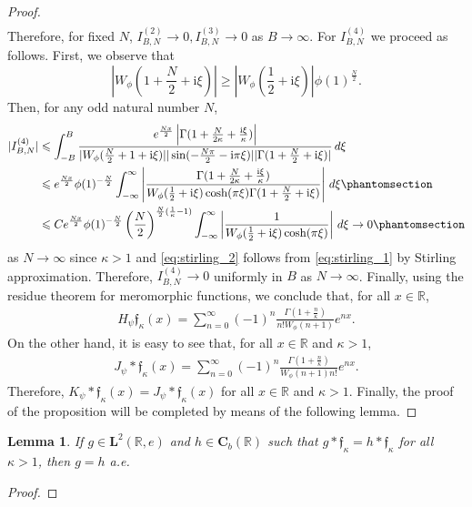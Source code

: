 \documentclass[12pt]{amsart}
\newcommand{\hlabel}{\phantomsection\label}
\numberwithin{equation}{section}
\newcommand{\bb}{\mathbb}
\renewcommand{\ge}{\geqslant}
\renewcommand{\le}{\leqslant}
\newcommand{\mf}{\mathfrak}
\newcommand{\bmrm}[2][2]{\mathbf{#2}^{#1}}
\newcommand{\Jpo}{J_{\psi}}
\newcommand{\Hpsi}{H_\psi}
\newcommand{\C}{\mathbf{C}}
\renewcommand{\i}{\mathrm{i}}
\newtheorem{lem}[thm]{Lemma}
\theoremstyle{definition}
\theoremstyle{assump}
\theoremstyle{remark}
\begin{document}
{\begin{proof}
\begin{align*}
\end{align*}
Therefore, for fixed $N$, $I^{(2)}_{B,N}\to 0, I^{(3)}_{B,N}\to 0$ as $B\to\infty$. For $I^{(4)}_{B,N}$ we proceed as follows. First, we observe that
$$\left|W_{\phi}\left(1+\frac{N}{2}+\mathrm{i}\xi\right)\right|\ge\left|W_{\phi}\left(\frac{1}{2}+\mathrm{i}\xi\right)\right|\phi(1)^{\frac{N}{2}}.$$
Then, for any odd natural number $N$,
\begin{align}
|I^{(4)}_{B,N}|&\le\int_{-B}^B\frac{e^{\frac{Nx}{2}}\left|\Gamma(1+\frac{N}{2\kappa}+\frac{{\rm{i}}\xi }{\kappa})\right|}{|W_{\phi}(\frac{N}{2}+1+\mathrm{i}\xi)||\sin(-\frac{N\pi}{2}-\i\pi\xi)||\Gamma(1+\frac{N}{2}+\mathrm{i}\xi)|}\,d\xi \nonumber \\
&\le e^{\frac{Nx}{2}}\phi(1)^{-\frac{N}{2}}\int_{-\infty}^\infty\left|\frac{\Gamma(1+\frac{N}{2\kappa}+\frac{{\rm{i}}\xi }{\kappa})}{W_{\phi}(\frac{1}{2}+\mathrm{i}\xi)\cosh(\pi\xi)\Gamma(1+\frac{N}{2}+\mathrm{i}\xi)}\right|\,d\xi \hlabel{eq:stirling_1} \\
&\le Ce^{\frac{Nx}{2}}\phi(1)^{-\frac{N}{2}}\left(\frac{N}{2}\right)^{\frac{N}{2}(\frac{1}{\kappa}-1)}\int_{-\infty}^\infty\left|\frac{1}{W_{\phi}(\frac{1}{2}+\mathrm{i}\xi)\cosh(\pi\xi)}\right|\,d\xi\to 0 \hlabel{eq:stirling_2}
\end{align}
as $N\to\infty$ since $\kappa>1$ and \eqref{eq:stirling_2} follows from \eqref{eq:stirling_1} by Stirling approximation. Therefore, $I^{(4)}_{B,N}\to 0$ uniformly in $B$ as $N\to\infty$. Finally, using the residue theorem for meromorphic functions, we conclude that, for all $x\in\bb{R}$,
\begin{align*}
\Hpsi\mf{f}_\kappa(x)=\sum_{n=0}^\infty (-1)^n\frac{\Gamma(1+\frac{n}{\kappa})}{n! W_{\phi}(n+1)}e^{nx} .
\end{align*}
On the other hand, it is easy to see that, for all $x\in\bb{R}$ and $\kappa>1$,
\begin{align*}
\Jpo\ast\mf{f}_\kappa (x)=\sum_{n=0}^\infty (-1)^n\frac{\Gamma(1+\frac{n}{\kappa})}{W_{\phi}(n+1)n!}e^{nx} .
\end{align*}
 Therefore, $K_\psi\ast\mf{f}_\kappa(x)=\Jpo\ast\mf{f}_\kappa(x)$ for all $x\in\bb{R}$ and $\kappa>1$. Finally, the proof of the proposition will be completed by means of the following lemma.
\end{proof}
\begin{lem}
If $g\in\bmrm{L}(\bb{R},e)$ and $h\in \C_b(\bb{R})$ such that $g\ast\mf{f}_\kappa=h\ast\mf{f}_\kappa$ for all $\kappa>1$, then $g=h$ a.e.
\end{lem}
\begin{proof}

\end{proof}}
\end{document}
